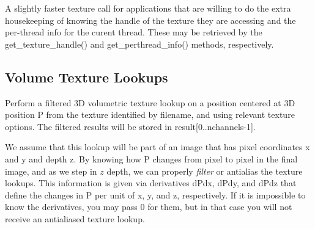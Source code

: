 A slightly faster {\cf texture} call for applications that are willing
to do the extra housekeeping of knowing the handle of the texture they
are accessing and the per-thread info for the curent thread.  These
may be retrieved by the {\cf get_texture_handle()} and 
{\cf get_perthread_info()} methods, respectively.
\apiend



\subsection{Volume Texture Lookups}
\label{sec:texturesys:api:texture3d}


Perform a filtered 3D volumetric texture lookup on a position centered at
3D position {\cf P} from the texture identified by
{\cf filename}, and using relevant texture {\cf options}.  The filtered
results will be stored in {\cf result[0..nchannels-1]}.

We assume that this lookup will be part of an image that has pixel
coordinates {\cf x} and {\cf y} and depth {\cf z}.  
By knowing how {\cf P} changes from
pixel to pixel in the final image, and as we step in $z$ depth, we can properly \emph{filter} or
antialias the texture lookups.  This information is given via
derivatives {\cf dPdx}, {\cf dPdy}, and {\cf dPdz} that define the changes in {\cf P}
per unit of {\cf x}, {\cf y}, and {\cf z}, respectively.  If it is impossible to
know the derivatives, you may pass 0 for them, but in that case you will
not receive an antialiased texture lookup.

